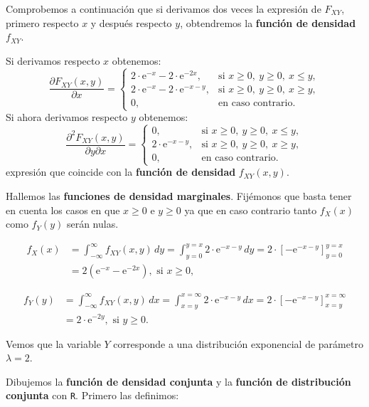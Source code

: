 \documentclass[]{book}
\begin{document}
Comprobemos a continuación que si derivamos dos veces la expresión de \(F_{XY}\), primero respecto \(x\) y después respecto \(y\), obtendremos la \textbf{función de densidad} \(f_{XY}\).

Si derivamos respecto \(x\) obtenemos:
\[
\frac{\partial F_{XY}(x,y)}{\partial x}=\begin{cases}
2\cdot\mathrm{e}^{-x}-2\cdot\mathrm{e}^{-2x}, & \mbox{si }x\geq 0,\ y\geq 0,\ x\leq y,\\
2\cdot\mathrm{e}^{-x}-2\cdot\mathrm{e}^{-x-y}, & \mbox{si }x\geq 0,\ y\geq 0,\ x\geq y,\\
0, & \mbox{en caso contrario.}
\end{cases}
\]
Si ahora derivamos respecto \(y\) obtenemos:
\[
\frac{\partial^2 F_{XY}(x,y)}{\partial y\partial x}=\begin{cases}
0, & \mbox{si }x\geq 0,\ y\geq 0,\ x\leq y,\\
2\cdot\mathrm{e}^{-x-y}, & \mbox{si }x\geq 0,\ y\geq 0,\ x\geq y,\\
0, & \mbox{en caso contrario.}
\end{cases}
\]
expresión que coincide con la \textbf{función de densidad} \(f_{XY}(x,y)\).

Hallemos las \textbf{funciones de densidad marginales}. Fijémonos que basta tener en cuenta los casos en que \(x\geq 0\) e \(y\geq 0\) ya que en caso contrario tanto \(f_X(x)\) como \(f_Y(y)\) serán nulas.

\[
\begin{array}{rl}
f_X(x) &=   \int_{-\infty}^{\infty} f_{XY}(x,y)\, dy =\int_{y=0}^{y=x}2\cdot\mathrm{e}^{-x-y}\, dy = 2\cdot\left[-\mathrm{e}^{-x-y}\right]_{y=0}^{y=x} \\ &=   2\left(\mathrm{e}^{-x}-\mathrm{e}^{-2x}\right),\mbox{ si }x\geq 0,
\end{array}
\]

\[
\begin{array}{rl}
f_Y(y) & =  \int_{-\infty}^{\infty} f_{XY}(x,y)\, dx =\int_{x=y}^{x=\infty}2\cdot\mathrm{e}^{-x-y}\, dx = 2\cdot\left[-\mathrm{e}^{-x-y}\right]_{x=y}^{x=\infty}\\ &= 2\cdot\mathrm{e}^{-2y}, \mbox{ si }y\geq 0.
\end{array}
\]

Vemos que la variable \(Y\) corresponde a una distribución exponencial de parámetro \(\lambda =2\).

Dibujemos la \textbf{función de densidad conjunta} y la \textbf{función de distribución conjunta} con \texttt{R}. Primero las definimos:
\end{document}
